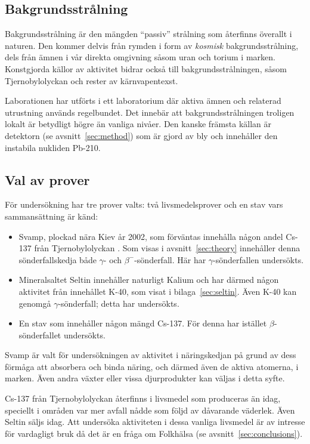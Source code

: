 \subsection{Bakgrundsstrålning} \label{sec:backgroundrad}

Bakgrundsstrålning är den mängden ``passiv'' strålning som återfinns överallt i
naturen. Den kommer delvis från rymden i form av \textit{kosmisk}
bakgrundsstrålning, dels från ämnen i vår direkta omgivning såsom uran och
torium i marken. Konstgjorda källor av aktivitet bidrar också till
bakgrundsstrålningen, såsom Tjernobylolyckan och rester av kärnvapentexst.

Laborationen har utförts i ett laboratorium där aktiva ämnen och relaterad
utrustning används regelbundet. Det innebär att bakgrundsstrålningen troligen
lokalt är betydligt högre än vanliga nivåer. Den kanske främsta källan är
detektorn (se avsnitt~\ref{sec:method}) som är gjord av bly och innehåller
den instabila nukliden Pb-210.

\subsection{Val av prover} \label{sec:samples}

För undersökning har tre prover valts: två livsmedelsprover och en stav vars 
sammansättning är känd:

\begin{itemize}
    \item Svamp, plockad nära Kiev år 2002, som förväntas innehålla någon
    andel Cs-137 från Tjernobylolyckan \parencite{instructions}. Som visas i
    avsnitt~\ref{sec:theory} innehåller denna sönderfallskedja både
    $\gamma$- och $\beta^-$-sönderfall. Här har $\gamma$-sönderfallen
    undersökts.

    \item Mineralsaltet Seltin innehåller naturligt Kalium och har därmed
    någon aktivitet från innehållet K-40, som visat i bilaga~\ref{sec:seltin}.
    Även K-40 kan genomgå $\gamma$-sönderfall; detta har undersökts.

    \item En stav som innehåller någon mängd Cs-137. För denna har istället
    $\beta$-sönderfallet undersökts.
\end{itemize}

Svamp är valt för undersökningen av aktivitet i näringskedjan på grund av dess
förmåga att absorbera och binda näring, och därmed även de aktiva atomerna, i
marken. Även andra växter eller vissa djurprodukter kan väljas i detta syfte.

Cs-137 från Tjernobylolyckan återfinns i livsmedel som produceras än idag,
speciellt i områden var mer avfall nådde som följd av dåvarande väderlek. Även
Seltin säljs idag. Att undersöka aktiviteten i dessa vanliga livsmedel är av
intresse för vardagligt bruk då det är en fråga om Folkhälsa
(se avsnitt~\ref{sec:conclusions}).
